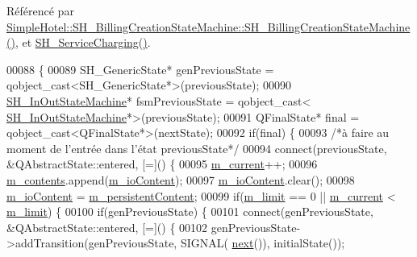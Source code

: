 Référencé par \hyperlink{classSimpleHotel_1_1SH__BillingCreationStateMachine_a8c7d39e11d0ced1fd9c27a5550465b86}{Simple\-Hotel\-::\-S\-H\-\_\-\-Billing\-Creation\-State\-Machine\-::\-S\-H\-\_\-\-Billing\-Creation\-State\-Machine()}, et \hyperlink{classSimpleHotel_1_1SH__ServiceCharging_ae82c86c7e955f0dc93cdfc3603789b87}{S\-H\-\_\-\-Service\-Charging()}.


\begin{DoxyCode}
00088 \{
00089     SH\_GenericState* genPreviousState = qobject\_cast<SH\_GenericState*>(previousState);
00090     \hyperlink{classSimpleHotel_1_1SH__InOutStateMachine_af725c1a19c2b13b7f07f3966e632a00b}{SH\_InOutStateMachine}* fsmPreviousState = qobject\_cast<
      \hyperlink{classSimpleHotel_1_1SH__InOutStateMachine_af725c1a19c2b13b7f07f3966e632a00b}{SH\_InOutStateMachine}*>(previousState);
00091     QFinalState* \textcolor{keyword}{final} = qobject\_cast<QFinalState*>(nextState);
00092     \textcolor{keywordflow}{if}(\textcolor{keyword}{final}) \{
00093         \textcolor{comment}{/*à faire au moment de l'entrée dans l'état previousState*/}
00094         connect(previousState, &QAbstractState::entered, [=]() \{
00095             \hyperlink{classSimpleHotel_1_1SH__LoopingInOutStateMachine_a700a3c54ef593c94815a0418d83dd381}{m\_current}++;
00096             \hyperlink{classSimpleHotel_1_1SH__LoopingInOutStateMachine_a46c3dab932ceedeef821a25fa8d6e5dd}{m\_contents}.append(\hyperlink{classSimpleHotel_1_1SH__InOutStateMachine_a4b0a3a48b0da31fddb724a357ad9b52c}{m\_ioContent});
00097             \hyperlink{classSimpleHotel_1_1SH__InOutStateMachine_a4b0a3a48b0da31fddb724a357ad9b52c}{m\_ioContent}.clear();
00098             \hyperlink{classSimpleHotel_1_1SH__InOutStateMachine_a4b0a3a48b0da31fddb724a357ad9b52c}{m\_ioContent} = \hyperlink{classSimpleHotel_1_1SH__LoopingInOutStateMachine_a6ed5f5c62373711ce123fb1a97fc3387}{m\_persistentContent};
00099             \textcolor{keywordflow}{if}(\hyperlink{classSimpleHotel_1_1SH__LoopingInOutStateMachine_ae5e496343aed89d7062e2478218f4e7d}{m\_limit} == 0 || \hyperlink{classSimpleHotel_1_1SH__LoopingInOutStateMachine_a700a3c54ef593c94815a0418d83dd381}{m\_current} < \hyperlink{classSimpleHotel_1_1SH__LoopingInOutStateMachine_ae5e496343aed89d7062e2478218f4e7d}{m\_limit}) \{
00100                 \textcolor{keywordflow}{if}(genPreviousState) \{
00101                     connect(genPreviousState, &QAbstractState::entered, [=]() \{
00102                         genPreviousState->addTransition(genPreviousState, SIGNAL(
      \hyperlink{classSimpleHotel_1_1SH__GenericStateMachine_a2de14d4920ae8c10b70c2d73fc2d4a93}{next}()), initialState());

\end{DoxyCode}

